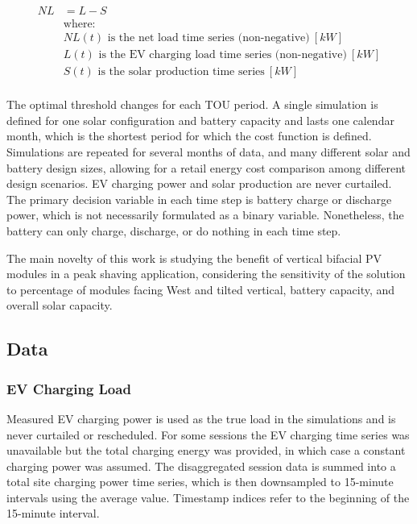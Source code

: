 \documentclass[journal,article,submit,pdftex,moreauthors]{Definitions/mdpi}
\begin{document}
\begin{equation}
  \label{eq:net-load}
  \begin{split}
    NL & = L - S                                                               \\
       & \text{where:}                                                         \\
       & NL(t) \text{ is the net load time series (non-negative)}\ [kW]        \\
       & L(t) \text{ is the EV charging load time series (non-negative)}\ [kW] \\
       & S(t) \text{ is the solar production time series}\ [kW]                \\
  \end{split}
\end{equation}

The optimal threshold changes for each TOU period. A single simulation is defined for one solar configuration and battery capacity and lasts one calendar month, which is the shortest period for which the cost function is defined. Simulations are repeated for several months of data, and many different solar and battery design sizes, allowing for a retail energy cost comparison among different design scenarios. EV charging power and solar production are never curtailed. The primary decision variable in each time step is battery charge or discharge power, which is not necessarily formulated as a binary variable. Nonetheless, the battery can only charge, discharge, or do nothing in each time step.

The main novelty of this work is studying the benefit of vertical bifacial PV modules in a peak shaving application, considering the sensitivity of the solution to percentage of modules facing West and tilted vertical, battery capacity, and overall solar capacity.


\subsection{Data}\label{data}%

\subsubsection{{EV Charging Load }}\label{ev-charging-load}%

Measured EV charging power is used as the true load in the simulations and is never curtailed or rescheduled. For some sessions the EV charging time series was unavailable but the total charging energy was provided, in which case a constant charging power was assumed. The disaggregated session data is summed into a total site charging power time series, which is then downsampled to 15-minute intervals using the average value. Timestamp indices refer to the beginning of the 15-minute interval.
\end{document}
